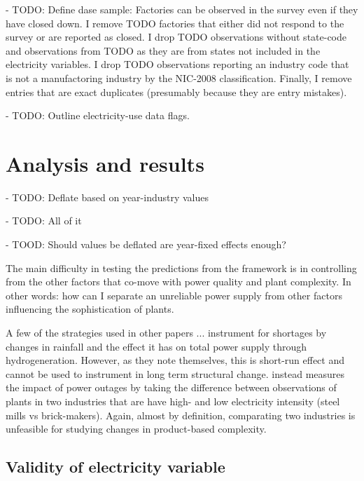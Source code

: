 \documentclass[11pt]{article}
\begin{document}
- TODO: Define dase sample: Factories can be observed in the survey even if they have closed down. I remove TODO factories that either did not respond to the survey or are reported as closed. I drop TODO observations without state-code and observations from TODO as they are from states not included in the electricity variables. I drop TODO observations reporting an industry code that is not a manufactoring industry by the NIC-2008 classification. Finally, I remove entries that are exact duplicates (presumably because they are entry mistakes). 

- TODO: Outline electricity-use data flags.


\newpage

\section{Analysis and results}%
\label{sec:analysis_and_results}

- TODO: Deflate based on year-industry values

- TODO: All of it

- TOOD: Should values be deflated are year-fixed effects enough?


The main difficulty in testing the predictions from the framework is in controlling from the other factors that co-move with power quality and plant complexity. In other words: how can I separate an unreliable power supply from other factors influencing the sophistication of plants. 

A few of the strategies used in other papers ...  \cite{allcott_how_2016} instrument for shortages by changes in rainfall and the effect it has on total power supply through hydrogeneration. However, as they note themselves, this is short-run effect and cannot be used to instrument in long term structural change.  \cite{alam_coping_2013} instead measures the impact of power outages by taking the difference between observations of plants in two industries that are have high- and low electricity intensity (steel mills vs brick-makers). Again, almost by definition, comparating two industries is unfeasible for studying changes in product-based complexity.

\subsection{Validity of electricity variable}%
\label{sub:validity_of_electricity_variable}
\end{document}
